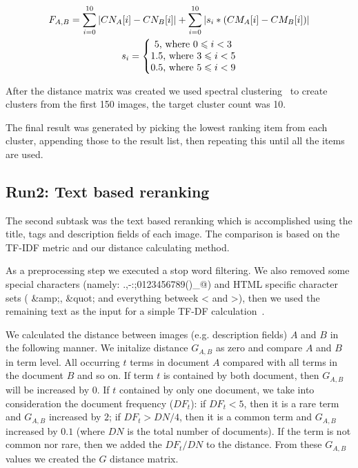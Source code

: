\documentclass{sig-alternate}
\begin{document}
\begin{gather*} 
F_{A,B} = \sum_{i=0}^{10}  \left | CN_{A}[i]-CN_{B}[i] \right | +\sum_{i=0}^{10} \left | s_i * (CM_{A}[i]-CM_{B}[i]) \right |\\
s_i = \left\{\begin{matrix}
5 \textup{, where }0 \leqslant  i < 3\\ 
1.5 \textup{, where }3 \leqslant  i < 5\\ 
0.5 \textup{, where }5 \leqslant  i < 9
\end{matrix}\right.
\end{gather*}

After the distance matrix was created we used spectral clustering~\cite{Ma2009,Ng01onspectral} to create clusters from the first 150 images, the target cluster count was 10. 

The final result was generated by picking the lowest ranking item from each cluster, appending those to the result list, then repeating this until all the items are used.

\subsection{Run2: Text based reranking}
The second subtask was the text based reranking which is accomplished using the title, tags and description fields of each image. The comparison is based on the TF-IDF metric and our distance calculating method.

As a preprocessing step we executed a stop word filtering. We also removed some special characters (namely: .,-:;0123456789()\_@) and HTML specific character sets ( \&amp;, \&quot; and everything betweek < and >), then we used the remaining text as the input for a simple TF-DF calculation~\cite{Yeh2008}. 

 We calculated the distance between images (e.g. description fields) $A$ and $B$ in the following manner. We initalize distance $G_{A,B}$ as zero and compare $A$ and $B$ in term level. All occurring $t$ terms in document $A$ compared with all terms in the document $B$ and so on. If term $t$ is contained by both document, then $G_{A,B}$ will be increased by $0$. If $t$ contained by only one document, we take into consideration the document frequency ($DF_t$): if $DF_t<5$, then it is a rare term and $G_{A,B}$ increased by $2$; if $DF_t>DN/4$, then it is a common term and  $G_{A,B}$ increased by $0.1$ (where $DN$ is the total number of documents). If the term is not common nor rare, then we added the $DF_t/DN$ to the distance. From these $G_{A,B}$ values we created the $G$ distance matrix.
\end{document}
